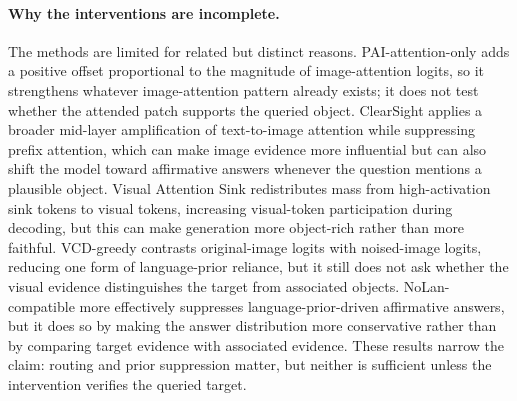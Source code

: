 \paragraph{Why the interventions are incomplete.} The methods are limited for related but distinct reasons. PAI-attention-only adds a positive offset proportional to the magnitude of image-attention logits, so it strengthens whatever image-attention pattern already exists; it does not test whether the attended patch supports the queried object. ClearSight applies a broader mid-layer amplification of text-to-image attention while suppressing prefix attention, which can make image evidence more influential but can also shift the model toward affirmative answers whenever the question mentions a plausible object. Visual Attention Sink redistributes mass from high-activation sink tokens to visual tokens, increasing visual-token participation during decoding, but this can make generation more object-rich rather than more faithful. VCD-greedy contrasts original-image logits with noised-image logits, reducing one form of language-prior reliance, but it still does not ask whether the visual evidence distinguishes the target from associated objects. NoLan-compatible more effectively suppresses language-prior-driven affirmative answers, but it does so by making the answer distribution more conservative rather than by comparing target evidence with associated evidence. These results narrow the claim: routing and prior suppression matter, but neither is sufficient unless the intervention verifies the queried target.
